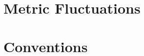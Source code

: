 \documentclass{article}
\begin{document}
\section{Metric Fluctuations}

\appendix
\section{Conventions}



\end{document}

